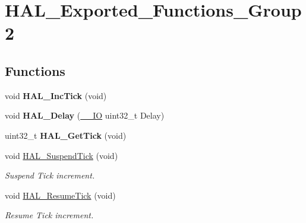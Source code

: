 \hypertarget{group___h_a_l___exported___functions___group2}{}\section{H\+A\+L\+\_\+\+Exported\+\_\+\+Functions\+\_\+\+Group2}
\label{group___h_a_l___exported___functions___group2}
\subsection*{Functions}
\begin{DoxyCompactItemize}
\item 
\mbox{\label{group___h_a_l___exported___functions___group2_gaa8361d44d76b7f6256834f828165837a}} 
void {\bfseries H\+A\+L\+\_\+\+Inc\+Tick} (void)
\item 
\mbox{\label{group___h_a_l___exported___functions___group2_gad0304dec8e33aca8c99e2836947b76d6}} 
void {\bfseries H\+A\+L\+\_\+\+Delay} (\hyperlink{core__sc300_8h_aec43007d9998a0a0e01faede4133d6be}{\+\_\+\+\_\+\+IO} uint32\+\_\+t Delay)
\item 
\mbox{\label{group___h_a_l___exported___functions___group2_gaf2c4f03d53e997a54e1fd5e80daa55c4}} 
uint32\+\_\+t {\bfseries H\+A\+L\+\_\+\+Get\+Tick} (void)
\item 
void \hyperlink{group___h_a_l___exported___functions___group2_gaaf651af2afe688a991c657f64f8fa5f9}{H\+A\+L\+\_\+\+Suspend\+Tick} (void)
\begin{DoxyCompactList}\small\item\em Suspend Tick increment. \end{DoxyCompactList}\item 
void \hyperlink{group___h_a_l___exported___functions___group2_ga24e0ee9dae1ec0f9d19200f5575ff790}{H\+A\+L\+\_\+\+Resume\+Tick} (void)
\begin{DoxyCompactList}\small\item\em Resume Tick increment. \end{DoxyCompactList}\item 
\mbox{\label{group___h_a_l___exported___functions___group2_gafb139b375512ad2a234e4619b129b966}} 

\end{DoxyCompactItemize}
